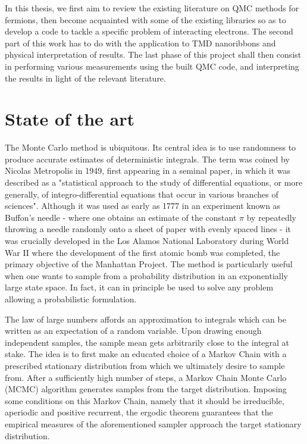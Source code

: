 \documentclass[10pt, twocolumn, twoside]{article}
\begin{document}
\medskip

In this thesis, we first aim to review the existing literature on QMC methods for fermions, then become acquainted with some of the existing libraries so as to develop a code to tackle a specific problem of interacting electrons. The second part of this work has to do with the application to TMD nanoribbons and physical interpretation of results. The last phase of this project shall then consist in performing various measurements using the built QMC code, and interpreting the results in light of the relevant literature.


\section{State of the art}


The Monte Carlo method is ubiquitous. Its central idea is to use randomness to produce accurate estimates of deterministic integrals. The term was coined by Nicolas Metropolis in 1949, first appearing in a seminal paper, in which it was described as a "statistical approach to the study of differential equations, or more generally, of integro-differential equations that occur in various branches of sciences"\cite{metropolis}. Although it was used as early as 1777 in an experiment known as Buffon's needle - where one obtains an estimate of the constant $\pi$ by repeatedly throwing  a needle randomly onto a sheet of paper with evenly spaced lines - it was crucially developed in the Los Alamos National Laboratory during World War II where the development of the first atomic bomb was completed, the primary objective of the Manhattan Project. The method is particularly useful when one wants to sample from a probability distribution in an exponentially large state space. In fact, it can in principle be used to solve any problem allowing a probabilistic formulation.\par

The law of large numbers affords an approximation to integrals which can be written as an expectation of a random variable. Upon drawing enough independent samples, the sample mean gets arbitrarily close to the integral at stake. The idea is to first make an educated choice of a Markov Chain with a prescribed stationary distribution from which we ultimately desire to sample from. After a sufficiently high number of steps, a Markov Chain Monte Carlo (MCMC) algorithm generates samples from the target distribution. Imposing some conditions on this Markov Chain, namely that it should be irreducible, aperiodic and positive recurrent, the ergodic theorem guarantees that the empirical measures of the aforementioned sampler approach the target stationary distribution.\par
\end{document}
